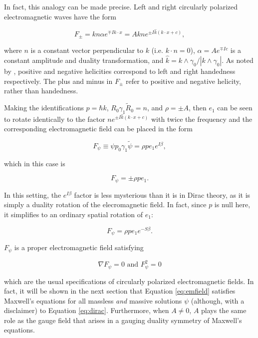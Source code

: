 \documentclass{article}
\begin{document}
  In fact, this analogy can be made precise. Left and right circularly polarized electromagnetic waves have the form\cite{gap}

    \begin{equation}
      F_\pm = k n \alpha e^{\mp I k \cdot x} = A k n e^{\pm I \hat k (k \cdot x + c)},\label{eq:emwaves}
    \end{equation}

    where $n$ is a constant vector perpendicular to $k$ (i.e. $k \cdot n= 0$), $\alpha = A e^{\mp I c}$ is a constant amplitude and duality transformation, and $\hat k = k \wedge \gamma_0 / |k \wedge \gamma_0|$. As noted by \cite{gap}, positive and negative helicities correspond to left and right handedness respectively. The plus and minus in $F_\pm$ refer to positive and negative helicity, rather than handedness.

    Making the identifications $p = \hbar k$, $R_0 \gamma_1 \widetilde R_0 = n$, and $\rho = \pm A$, then $e_1$ can be seen to rotate identically to the factor $n e^{\pm I \hat k (k \cdot x + c)}$ with twice the frequency and the corresponding electromagnetic field can be placed in the form

    \begin{equation}
      F_\psi \equiv \psi p_0 \gamma_1 \widetilde \psi = \rho p e_1 e^{I \beta}, \label{eq:emfield}
    \end{equation}

    which in this case is

    \begin{equation}
      F_\psi = \pm \rho p e_1.
    \end{equation}

    In this setting, the $e^{I \beta}$ factor is less mysterious than it is in Dirac theory, as it is simply a duality rotation of the elecromagnetic field. In fact, since $p$ is null here, it simplifies to an ordinary spatial rotation of $e_1$:

    \begin{equation}
      F_\psi = \rho p e_1 e^{-S \beta}.
    \end{equation}

    $F_\psi$ is a proper electromagnetic field satisfying

    \begin{equation}
      \nabla F_\psi = 0 \text { and } F_\psi^2 = 0
    \end{equation}

    which are the usual specifications of circularly polarized electromagnetic fields. In fact, it will be shown in the next section that Equation \ref{eq:emfield} satisfies Maxwell's equations for all massless \emph{and} massive solutions $\psi$ (although, with a disclaimer) to Equation \ref{eq:dirac}. Furthermore, when $A \not= 0$, $A$ plays the same role as the gauge field that arises in a gauging duality symmetry of Maxwell's equations.
\end{document}
